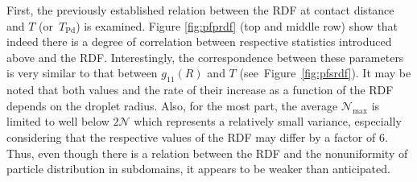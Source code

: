 \documentclass{pracamgren}
\begin{document}
First, the previously established relation between the RDF at contact distance and $T$ (or~$T_{\text{Pd}}$) is examined.
Figure \ref{fig:pfprdf} (top and middle row) show that indeed there is a degree of correlation between respective statistics introduced above and the RDF.
Interestingly, the correspondence between these parameters is very similar to that between $g_{11}(R)$ and $T$ (see~Figure~\ref{fig:pfsrdf}).
It may be noted that both values and the rate of their increase as a function of the RDF depends on the droplet radius.
Also, for the most part, the average $\mathcal{N}_{\text{max}}$ is limited to well below $2 \mathcal{N}$ which represents a relatively small variance, especially considering that the respective values of the RDF may differ by a factor of $6$.
Thus, even though there is a relation between the RDF and the nonuniformity of particle distribution in subdomains, it appears to be weaker than anticipated.
\end{document}
